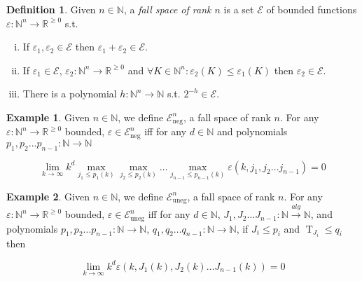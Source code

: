 \documentclass{article}
\theoremstyle{definition}
\newtheorem{definition}{Definition}[section]
\newtheorem{example}{Example}[section]
\theoremstyle{plain}
\DeclareMathOperator{\T}{T}
\newcommand{\Nats}{\mathbb{N}}
\newcommand{\Reals}{\mathbb{R}}
\newcommand{\Lim}[1]{\lim_{#1 \rightarrow \infty}}
\begin{document}
\begin{definition}

Given $n \in \Nats$, a \emph{fall space of rank $n$} is a set $\mathcal{E}$ of bounded functions $\varepsilon: \Nats^n \rightarrow \Reals^{\geq 0}$ s.t.

\begin{enumerate}[(i)]

\item If $\varepsilon_1, \varepsilon_2 \in \mathcal{E}$ then $\varepsilon_1 + \varepsilon_2 \in \mathcal{E}$.

\item If $\varepsilon_1 \in \mathcal{E}$, $\varepsilon_2: \Nats^n \rightarrow \Reals^{\geq 0}$ and $\forall K \in \Nats^n: \varepsilon_2(K) \leq \varepsilon_1(K)$ then $\varepsilon_2 \in \mathcal{E}$.

\item There is a polynomial $h: \Nats^n \rightarrow \Nats$ s.t. $2^{-h} \in \mathcal{E}$.

\end{enumerate}

\end{definition}

\begin{example}

Given $n \in \Nats$, we define $\mathcal{E}_{\text{neg}}^n$, a fall space of rank $n$. For any $\varepsilon: \Nats^n \rightarrow \Reals^{\geq 0}$ bounded, $\varepsilon \in \mathcal{E}_{\text{neg}}^n$ iff for any $d \in \Nats$ and polynomials ${p_1,p_2 \ldots p_{n-1}: \Nats \rightarrow \Nats}$

$$\Lim{k} k^d \max_{j_1 \leq p_1(k)} \max_{j_2 \leq p_2(k)} \ldots \max_{j_{n-1} \leq p_{n-1}(k)} \varepsilon(k,j_1,j_2 \ldots j_{n-1}) = 0$$

\end{example}

\begin{example}

Given $n \in \Nats$, we define $\mathcal{E}_{\text{uneg}}^n$, a fall space of rank $n$. For any ${\varepsilon: \Nats^n \rightarrow \Reals^{\geq 0}}$ bounded, $\varepsilon \in \mathcal{E}_{\text{uneg}}^n$ iff for any $d \in \Nats$, ${J_1,J_2 \ldots J_{n-1}: \Nats \xrightarrow{alg} \Nats}$, and polynomials ${p_1,p_2 \ldots p_{n-1}: \Nats \rightarrow \Nats}$, ${q_1,q_2 \ldots q_{n-1}: \Nats \rightarrow \Nats}$, if $J_i \leq p_i$ and $\T_{J_i} \leq q_i$ then

$$\Lim{k} k^d \varepsilon(k,J_1(k),J_2(k) \ldots J_{n-1}(k)) = 0$$

\end{example}
\end{document}
